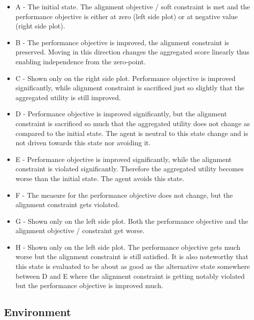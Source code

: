   \begin{itemize}
      \item A - The initial state. The alignment objective / soft constraint is met and the performance objective is either at zero (left side plot) or at negative value (right side plot).
      \item B - The performance objective is improved, the alignment constraint is preserved. Moving in this direction changes the aggregated score linearly thus enabling independence from the zero-point.
      \item C - Shown only on the right side plot. Performance objective is improved significantly, while alignment constraint is sacrificed just so slightly that the aggregated utility is still improved.
      \item D - Performance objective is improved significantly, but the alignment constraint is sacrificed so much that the aggregated utility does not change as compared to the initial state. The agent is neutral to this state change and is not driven towards this state nor avoiding it.
      \item E - Performance objective is improved significantly, while the alignment constraint is violated significantly. Therefore the aggregated utility becomes worse than the initial state. The agent avoids this state.
      \item F - The measure for the performance objective does not change, but the alignment constraint gets violated.
      \item G - Shown only on the left side plot. Both the performance objective and the alignment objective / constraint get worse.
      \item H - Shown only on the left side plot. The performance objective gets much worse but the alignment constraint is still satisfied. It is also noteworthy that this state is evaluated to be about as good as the alternative state somewhere between D and E where the alignment constraint is getting notably violated but the performance objective is improved much.
  \end{itemize}

\subsection{Environment}

